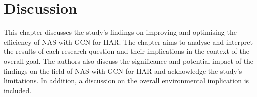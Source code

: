\chapter{Discussion}\label{discussion}
This chapter discusses the study's findings on improving and optimising the efficiency of \gls{NAS} with \gls{GCN} for \gls{HAR}. The chapter aims to analyse and interpret the results of each research question and their implications in the context of the overall goal. The authors also discuss the significance and potential impact of the findings on the field of \gls{NAS} with \gls{GCN} for \gls{HAR} and acknowledge the study's limitations. In addition, a discussion on the overall environmental implication is included. 


%


